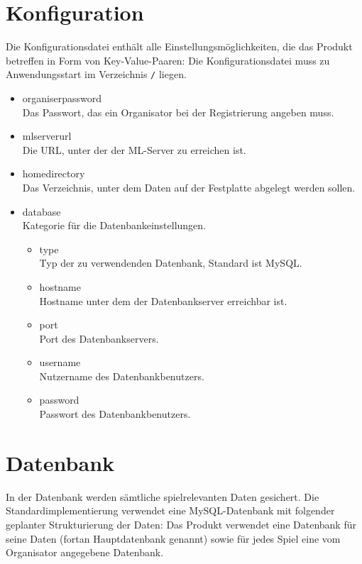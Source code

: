 \documentclass[a4paper]{scrreprt}
\begin{document}
    \section{Konfiguration}
    Die Konfigurationsdatei enthält alle Einstellungsmöglichkeiten, die das Produkt betreffen in Form von Key-Value-Paaren:
    Die Konfigurationsdatei muss zu Anwendungsstart im Verzeichnis \texttt{/} liegen. %
    \begin{itemize}
        \item organiserpassword \\Das Passwort, das ein Organisator bei der Registrierung angeben muss.
        \item mlserverurl       \\Die URL, unter der der ML-Server zu erreichen ist.
        \item homedirectory     \\Das Verzeichnis, unter dem Daten auf der Festplatte abgelegt werden sollen.
        \item database          \\Kategorie für die Datenbankeinstellungen.
        \begin{itemize}
            \item type          \\Typ der zu verwendenden Datenbank, Standard ist MySQL.
            \item hostname      \\Hostname unter dem der Datenbankserver erreichbar ist.
            \item port          \\Port des Datenbankservers.
            \item username      \\Nutzername des Datenbankbenutzers.
            \item password      \\Passwort des Datenbankbenutzers.
        \end{itemize}
    \end{itemize}

    \section{Datenbank}
    In der Datenbank werden sämtliche spielrelevanten Daten gesichert.
    Die Standardimplementierung verwendet eine MySQL-Datenbank mit folgender geplanter Strukturierung der Daten:
    Das Produkt verwendet eine Datenbank für seine Daten (fortan Hauptdatenbank genannt) sowie für jedes Spiel eine vom Organisator angegebene Datenbank.
\end{document}
